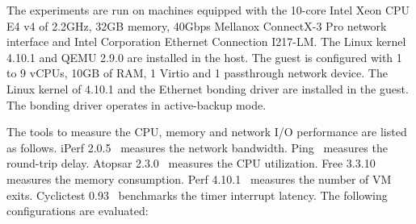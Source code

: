 
The experiments are run on machines equipped with the 10-core
Intel Xeon CPU E4 v4 of 2.2GHz, 32GB memory, 40Gbps Mellanox
ConnectX-3 Pro network interface and Intel Corporation
Ethernet Connection I217-LM. The Linux kernel 4.10.1 and QEMU
2.9.0 are installed in the host. The guest is configured with
1 to 9 vCPUs, 10GB of RAM, 1 Virtio and 1 passthrough network
device. The Linux kernel of 4.10.1 and the Ethernet bonding
driver are installed in the guest. The bonding driver operates
in active-backup mode.

The tools to measure the CPU, memory and network I/O
performance are listed as follows. iPerf 2.0.5~\cite{iperf}
measures the network bandwidth. Ping~\cite{ping} measures the
round-trip delay. Atopsar 2.3.0~\cite{atopsar} measures the
CPU utilization. Free 3.3.10~\cite{free} measures the memory
consumption. Perf 4.10.1~\cite{perf} measures the number of VM
exits. Cyclictest 0.93~\cite{cyclictest} benchmarks the timer
interrupt latency. 
The following configurations are evaluated:

